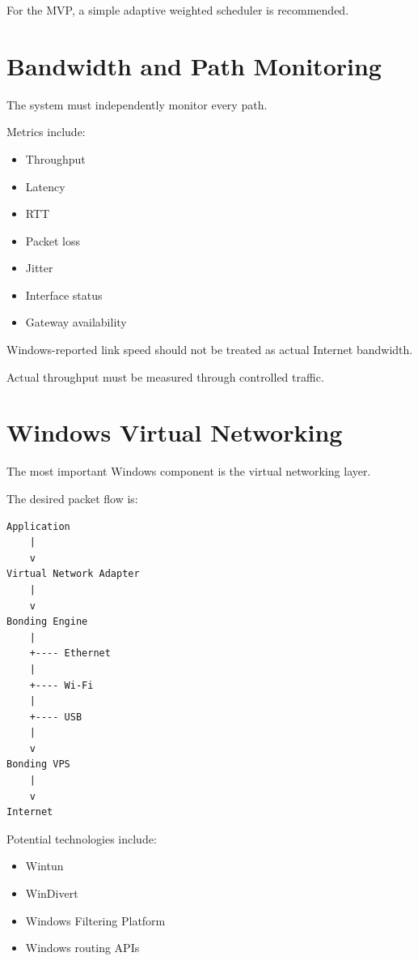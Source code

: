 \documentclass[12pt,a4paper]{article}
\begin{document}
For the MVP, a simple adaptive weighted scheduler is recommended.


\section{Bandwidth and Path Monitoring}

The system must independently monitor every path.

Metrics include:

\begin{itemize}
    \item Throughput
    \item Latency
    \item RTT
    \item Packet loss
    \item Jitter
    \item Interface status
    \item Gateway availability
\end{itemize}

Windows-reported link speed should not be treated as actual Internet bandwidth.

Actual throughput must be measured through controlled traffic.


\section{Windows Virtual Networking}

The most important Windows component is the virtual networking layer.

The desired packet flow is:

\begin{verbatim}
Application
    |
    v
Virtual Network Adapter
    |
    v
Bonding Engine
    |
    +---- Ethernet
    |
    +---- Wi-Fi
    |
    +---- USB
    |
    v
Bonding VPS
    |
    v
Internet
\end{verbatim}

Potential technologies include:

\begin{itemize}
    \item Wintun
    \item WinDivert
    \item Windows Filtering Platform
    \item Windows routing APIs
\end{itemize}
\end{document}
